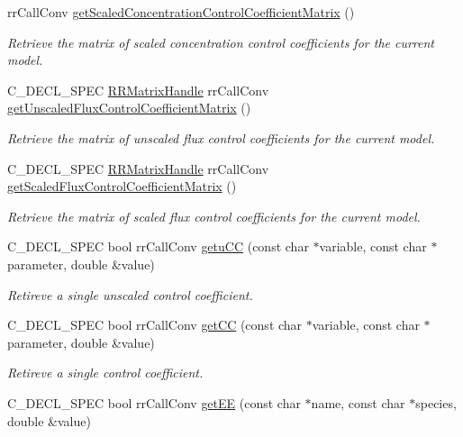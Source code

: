 \begin{DoxyCompactItemize}
rr\-Call\-Conv \hyperlink{group__utility_gad28644ca7615c71725056028a0a048ba}{get\-Scaled\-Concentration\-Control\-Coefficient\-Matrix} ()
\begin{DoxyCompactList}\small\item\em \-Retrieve the matrix of scaled concentration control coefficients for the current model. \end{DoxyCompactList}\item 
\-C\-\_\-\-D\-E\-C\-L\-\_\-\-S\-P\-E\-C \hyperlink{rr__c__types_8h_a87174eefa58ae98dec58c9253ae6c5da}{\-R\-R\-Matrix\-Handle} \*
rr\-Call\-Conv \hyperlink{group__utility_ga4b464166bb67773916067bc7e190a338}{get\-Unscaled\-Flux\-Control\-Coefficient\-Matrix} ()
\begin{DoxyCompactList}\small\item\em \-Retrieve the matrix of unscaled flux control coefficients for the current model. \end{DoxyCompactList}\item 
\-C\-\_\-\-D\-E\-C\-L\-\_\-\-S\-P\-E\-C \hyperlink{rr__c__types_8h_a87174eefa58ae98dec58c9253ae6c5da}{\-R\-R\-Matrix\-Handle} \*
rr\-Call\-Conv \hyperlink{group__utility_gad63647a85b299d463b1e4cd5671d0881}{get\-Scaled\-Flux\-Control\-Coefficient\-Matrix} ()
\begin{DoxyCompactList}\small\item\em \-Retrieve the matrix of scaled flux control coefficients for the current model. \end{DoxyCompactList}\item 
\-C\-\_\-\-D\-E\-C\-L\-\_\-\-S\-P\-E\-C bool rr\-Call\-Conv \hyperlink{group__utility_ga6655b7aebdc9e6fad4e7a54e3de9195d}{getu\-C\-C} (const char $\ast$variable, const char $\ast$parameter, double \&value)
\begin{DoxyCompactList}\small\item\em \-Retireve a single unscaled control coefficient. \end{DoxyCompactList}\item 
\-C\-\_\-\-D\-E\-C\-L\-\_\-\-S\-P\-E\-C bool rr\-Call\-Conv \hyperlink{group__utility_ga49c703842a069c37fa472f2740dd514b}{get\-C\-C} (const char $\ast$variable, const char $\ast$parameter, double \&value)
\begin{DoxyCompactList}\small\item\em \-Retireve a single control coefficient. \end{DoxyCompactList}\item 
\-C\-\_\-\-D\-E\-C\-L\-\_\-\-S\-P\-E\-C bool rr\-Call\-Conv \hyperlink{group__utility_ga761a98e3635d75c8505f516a0b2384b1}{get\-E\-E} (const char $\ast$name, const char $\ast$species, double \&value)

\end{DoxyCompactItemize}
